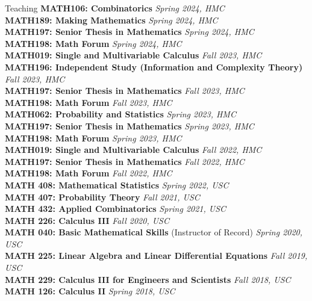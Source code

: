 \documentclass{cv} %
\begin{document}
\begin{rSection}{Teaching}
  \textbf{MATH106: Combinatorics} \hfill \textit{Spring 2024, HMC}\\
  \textbf{MATH189: Making Mathematics} \hfill \textit{Spring 2024, HMC}\\
  \textbf{MATH197: Senior Thesis in Mathematics} \hfill \textit{Spring 2024, HMC}\\
  \textbf{MATH198: Math Forum} \hfill \textit{Spring 2024, HMC}\\
  \textbf{MATH019: Single and Multivariable Calculus} \hfill \textit{Fall 2023, HMC}\\
  \textbf{MATH196: Independent Study (Information and Complexity Theory)} \hfill \textit{Fall 2023, HMC}\\
  \textbf{MATH197: Senior Thesis in Mathematics} \hfill \textit{Fall 2023, HMC}\\
  \textbf{MATH198: Math Forum} \hfill \textit{Fall 2023, HMC}\\
  \textbf{MATH062: Probability and Statistics} \hfill \textit{Spring 2023, HMC}\\
  \textbf{MATH197: Senior Thesis in Mathematics} \hfill \textit{Spring 2023, HMC}\\
  \textbf{MATH198: Math Forum} \hfill \textit{Spring 2023, HMC}\\
  \textbf{MATH019: Single and Multivariable Calculus} \hfill \textit{Fall 2022, HMC}\\
  \textbf{MATH197: Senior Thesis in Mathematics} \hfill \textit{Fall 2022, HMC}\\
  \textbf{MATH198: Math Forum} \hfill \textit{Fall 2022, HMC}\\
  \textbf{MATH 408: Mathematical Statistics} \hfill \textit{Spring 2022, USC} \\
  \textbf{MATH 407: Probability Theory} \hfill \textit{Fall 2021, USC} \\
  \textbf{MATH 432: Applied Combinatorics} \hfill \textit{Spring 2021, USC} \\
  \textbf{MATH 226: Calculus III} \hfill \textit{Fall 2020, USC} \\
  \textbf{MATH 040: Basic Mathematical Skills} (Instructor of Record) \hfill \textit{Spring 2020, USC} \\
  \textbf{MATH 225: Linear Algebra and Linear Differential Equations} \hfill \textit{Fall 2019, USC} \\
  \textbf{MATH 229: Calculus III for Engineers and Scientists} \hfill \textit{Fall 2018, USC} \\
  \textbf{MATH 126: Calculus II} \hfill \textit{Spring 2018, USC}
\end{rSection}
\end{document}
